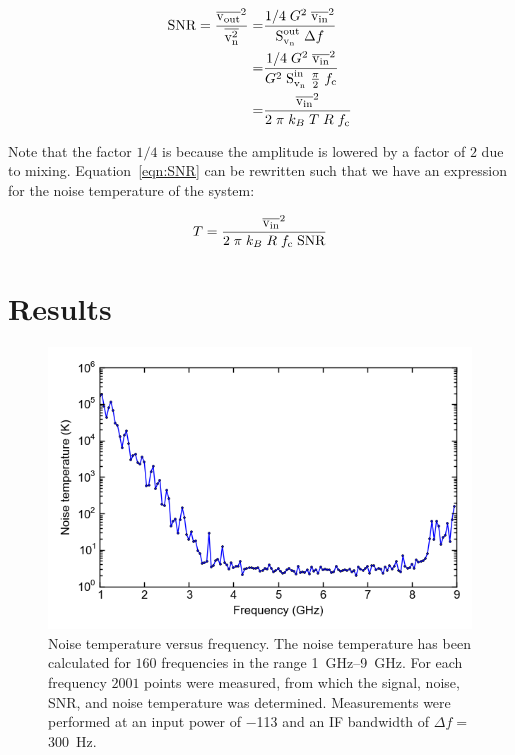 \documentclass[12pt]{report}
\begin{document}
\begin{align}
    \text{SNR} = \frac{\overline{\text{v}_\text{out}}^2}{\overline{\text{v}_\text{n}^2}} = & \frac{1/4 \;G^2 \; \overline{\text{v}_\text{in}}^2}{ \text{S}_{\text{v}_\text{n}}^\text{out} \; \Delta f}\notag\\
        = & \frac{1/4 \; G^2 \; \overline{\text{v}_\text{in}}^2}{G^2 \; \text{S}_{\text{v}_\text{n}}^\text{in} \;\frac{\pi}{2}\;f_\text{c}}\notag\\
        = & \frac{\overline{\text{v}_\text{in}}^2}{2 \; \pi \; k_B \; T \; R \; f_\text{c}}
    \label{eqn:SNR}
\end{align}

Note that the factor $1/4$ is because the amplitude is lowered by a factor of $2$ due to mixing. Equation~\ref{eqn:SNR} can be rewritten such that we have an expression for the noise temperature of the system:

\begin{equation}
    T =\frac{\overline{\text{v}_\text{in}}^2}{2 \; \pi \; k_B \; R \; f_\text{c} \; \text{SNR}}
    \label{eqn:noise temperature}
\end{equation}


\section{Results}
\label{sec:noise_results}
\begin{figure}[h]
    \centering
    \includegraphics[width = .7 \linewidth]{Figures/noise_temperature_versus_power.png}
    \caption{Noise temperature versus frequency. The noise temperature has been calculated for $160$ frequencies in the range \SIrange{1}{9}{\giga \hertz}. For each frequency $2001$ points were measured, from which the signal, noise, SNR, and noise temperature was determined. Measurements were performed at an input power of \SI{-113}{\dBm} and an IF bandwidth of $\Delta f = $\SI{300}{\hertz}.}
    \label{fig:Noise temperature}
\end{figure}
\end{document}
